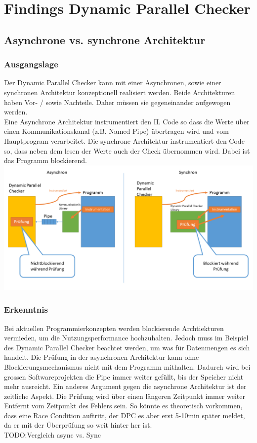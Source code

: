 \documentclass[10pt,a4paper]{article}
\begin{document}
\section{Findings Dynamic Parallel Checker}
\subsection{Asynchrone vs. synchrone Architektur}
\subsubsection{Ausgangslage}
\begin{flushleft}
Der Dynamic Parallel Checker kann mit einer Asynchronen, sowie einer synchronen Architektur konzeptionell realisiert werden. Beide Architekturen haben Vor- / sowie Nachteile. Daher müssen sie gegeneinander aufgewogen werden.\\
Eine Asynchrone Architektur instrumentiert den IL Code so dass die Werte über einen Kommunikationskanal (z.B. Named Pipe) übertragen wird und vom Hauptprogram verarbeitet.
Die synchrone Architektur instrumentiert den Code so, dass neben dem lesen der Werte auch der Check übernommen wird. Dabei ist das Programm blockierend.
\includegraphics[width=16cm, clip]{pictures/AsnycSyncArchitecture.png}
\end{flushleft}
\subsubsection{Erkenntnis}
\begin{flushleft}
Bei aktuellen Programmierkonzepten werden blockierende Archtiekturen vermieden, um die Nutzungsperformance hochzuhalten. Jedoch muss im Beispiel des Dynamic Parallel Checker beachtet werden, um was für Datenmengen es sich handelt. Die Prüfung in der asynchronen Architektur kann ohne Blockierungsmechanismus nicht mit dem Programm mithalten. Dadurch wird bei grossen Softwareprojekten die Pipe immer weiter gefüllt, bis der Speicher nicht mehr ausreicht. Ein anderes Argument gegen die asynchrone Architektur ist der zeitliche Aspekt. Die Prüfung wird über einen längeren Zeitpunkt immer weiter Entfernt vom Zeitpunkt des Fehlers sein. So könnte es theoretisch vorkommen, dass eine Race Condition auftritt, der DPC es aber erst 5-10min später meldet, da er mit der Überprüfung so weit hinter her ist.\\
{\huge \color{red} TODO:Vergleich async vs. Sync}
\end{flushleft}
\end{document}
